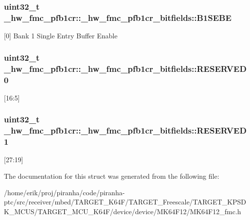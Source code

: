 \subsubsection[{\texorpdfstring{B1\+S\+E\+BE}{B1SEBE}}]{\setlength{\rightskip}{0pt plus 5cm}uint32\+\_\+t \+\_\+hw\+\_\+fmc\+\_\+pfb1cr\+::\+\_\+hw\+\_\+fmc\+\_\+pfb1cr\+\_\+bitfields\+::\+B1\+S\+E\+BE}\hypertarget{struct__hw__fmc__pfb1cr_1_1__hw__fmc__pfb1cr__bitfields_a5fa58b24fb22c88965bfbdf84e2ac529}{}\label{struct__hw__fmc__pfb1cr_1_1__hw__fmc__pfb1cr__bitfields_a5fa58b24fb22c88965bfbdf84e2ac529}
\mbox{[}0\mbox{]} Bank 1 Single Entry Buffer Enable 
\subsubsection[{\texorpdfstring{R\+E\+S\+E\+R\+V\+E\+D0}{RESERVED0}}]{\setlength{\rightskip}{0pt plus 5cm}uint32\+\_\+t \+\_\+hw\+\_\+fmc\+\_\+pfb1cr\+::\+\_\+hw\+\_\+fmc\+\_\+pfb1cr\+\_\+bitfields\+::\+R\+E\+S\+E\+R\+V\+E\+D0}\hypertarget{struct__hw__fmc__pfb1cr_1_1__hw__fmc__pfb1cr__bitfields_acfe5ab2389ba8277932d94d3cc23d2fb}{}\label{struct__hw__fmc__pfb1cr_1_1__hw__fmc__pfb1cr__bitfields_acfe5ab2389ba8277932d94d3cc23d2fb}
\mbox{[}16\+:5\mbox{]} 
\subsubsection[{\texorpdfstring{R\+E\+S\+E\+R\+V\+E\+D1}{RESERVED1}}]{\setlength{\rightskip}{0pt plus 5cm}uint32\+\_\+t \+\_\+hw\+\_\+fmc\+\_\+pfb1cr\+::\+\_\+hw\+\_\+fmc\+\_\+pfb1cr\+\_\+bitfields\+::\+R\+E\+S\+E\+R\+V\+E\+D1}\hypertarget{struct__hw__fmc__pfb1cr_1_1__hw__fmc__pfb1cr__bitfields_aa0a88418996eaf7be19c15e35ca4322f}{}\label{struct__hw__fmc__pfb1cr_1_1__hw__fmc__pfb1cr__bitfields_aa0a88418996eaf7be19c15e35ca4322f}
\mbox{[}27\+:19\mbox{]} 

The documentation for this struct was generated from the following file\+:\begin{DoxyCompactItemize}
\item 
/home/erik/proj/piranha/code/piranha-\/ptc/src/receiver/mbed/\+T\+A\+R\+G\+E\+T\+\_\+\+K64\+F/\+T\+A\+R\+G\+E\+T\+\_\+\+Freescale/\+T\+A\+R\+G\+E\+T\+\_\+\+K\+P\+S\+D\+K\+\_\+\+M\+C\+U\+S/\+T\+A\+R\+G\+E\+T\+\_\+\+M\+C\+U\+\_\+\+K64\+F/device/device/\+M\+K64\+F12/M\+K64\+F12\+\_\+fmc.\+h\end{DoxyCompactItemize}

